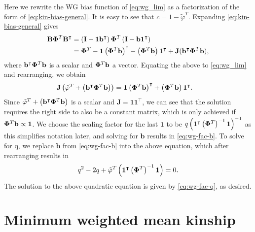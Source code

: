 \documentclass[11pt]{article}
\newcommand{\kinMat}[1][T]{%
  \ensuremath{%
    \mathbf{\Phi}^{#1}
  }%
  \xspace%
}%
\begin{document}
\begin{appendices}
  Here we rewrite the WG bias function of \cref{eq:wg_lim} as a factorization of the form of \cref{eq:kin-bias-general}.
  It is easy to see that $c = 1 - \tilde{\varphi}^T$.
  Expanding \cref{eq:kin-bias-general} gives
  \begin{align*}
    \mathbf{B} \kinMat \mathbf{B}^\intercal
    &= \left( \mathbf{I} - \mathbf{1} \mathbf{b}^\intercal \right) \kinMat \left( \mathbf{I} - \mathbf{b} \mathbf{1}^\intercal \right)
    \\
    &= \kinMat - \mathbf{1} \left( \kinMat \mathbf{b} \right)^\intercal - \left( \kinMat \mathbf{b} \right) \mathbf{1}^\intercal + \mathbf{J}(\mathbf{b}^\intercal \kinMat \mathbf{b} ),
  \end{align*} 
  where $\mathbf{b}^\intercal \kinMat \mathbf{b}$ is a scalar and $\kinMat\mathbf{b}$ a vector.
  Equating the above to \cref{eq:wg_lim} and rearranging, we obtain
  \begin{align*}
    \mathbf{J} \left( \tilde{\varphi}^T + \left( \mathbf{b}^\intercal \kinMat \mathbf{b} \right) \right)
    &= \mathbf{1} \left( \kinMat \mathbf{b} \right)^\intercal + \left( \kinMat\mathbf{b} \right) \mathbf{1}^\intercal .
  \end{align*}
  Since $\tilde{\varphi}^T + \left( \mathbf{b}^\intercal \kinMat \mathbf{b} \right)$ is a scalar and $\mathbf{J} = \mathbf{1} \mathbf{1}^\intercal$, we can see that the solution requires the right side to also be a constant matrix, which is only achieved if $\kinMat\mathbf{b} \propto \mathbf{1}$.
  We choose the scaling factor for the last $\mathbf{1}$ to be $q \left( \mathbf{1}^\intercal \left( \kinMat \right)^{-1} \mathbf{1} \right)^{-1}$ as this simplifies notation later, and solving for $\mathbf{b}$ results in \cref{eq:wg-fac-b}.
  To solve for q, we replace $\mathbf{b}$ from \cref{eq:wg-fac-b} into the above equation, which after rearranging results in
  \begin{align*}
    q^2 - 2q + \tilde{\varphi}^T \left( \mathbf{1}^\intercal \left( \kinMat \right)^{-1} \mathbf{1} \right) = 0.
  \end{align*}
  The solution to the above quadratic equation is given by \cref{eq:wg-fac-q}, as desired.

  \section{Minimum weighted mean kinship}

  \label{sec:min_w_mean_kin}


\end{appendices}
\end{document}
